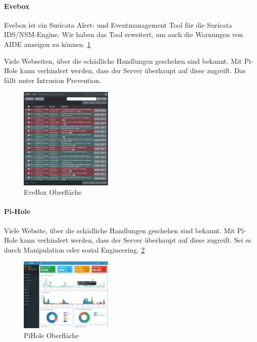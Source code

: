 \documentclass{article}
\begin{document}
\paragraph{Evebox}
Evebox ist ein Suricata Alert- und Eventmanagement Tool für die Suricata IDS/NSM-Engine. Wir haben das Tool erweitert, um auch die Warnungen von AIDE anzeigen zu können. \ref{fig:EveBox}

Viele Webseiten, über die schädliche Handlungen geschehen sind bekannt. Mit Pi-Hole kann verhindert werden, dass der Server überhaupt auf diese zugreift. Das fällt unter Intrusion Prevention.

\begin{figure}[ht]
    \centering
    \includegraphics[width=0.4\textwidth]{assets/EveBox.png}
    \caption[\href{https://evebox.org/}{EveBox von Evebox}]{\label{fig:EveBox}EveBox Oberfläche}
\end{figure}

\paragraph{Pi-Hole}
Viele Website, über die schädliche Handlungen geschehen sind bekannt. Mit Pi-Hole kann verhindert werden, dass der Server überhaupt auf diese zugreift. Sei es durch Manipulation oder sozial Engineering. \ref{fig:PiHole}

\begin{figure}[ht]
    \centering
    \includegraphics[width=0.4\textwidth]{assets/PiHole.png}
    \caption[\href{https://commons.wikimedia.org/w/index.php?curid=71217077}{PiHole von Wikimedia}]{\label{fig:PiHole}PiHole Oberfläche}
\end{figure}
\end{document}
